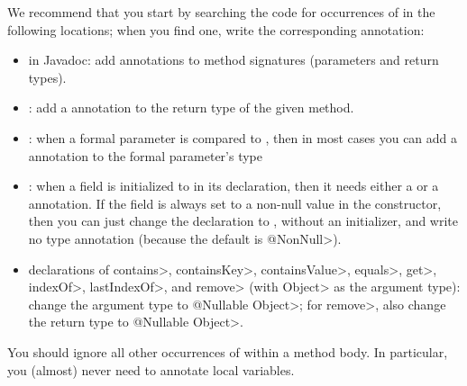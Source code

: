 We recommend that you start by searching the code for occurrences of
 in the following locations; when you find one, write the
corresponding annotation:

\begin{itemize}
\item
  in Javadoc:  add  annotations to method signatures (parameters and return types).
\item
  :  add a  annotation to the return type
  of the given method.
\item
  :  when a formal parameter is compared to
  , then in most cases you can add a  annotation
  to the formal parameter's type
\item
  :  when a field is initialized to
   in its declaration, then it needs either a
   or a
   annotation.  If the field
  is always set to a non-null value in the constructor, then you can just
  change the declaration to , without an
  initializer, and write no type annotation (because the default is
  \<@NonNull>).
\item
  declarations of \<contains>, \<containsKey>, \<containsValue>, \<equals>,
  \<get>, \<indexOf>, \<lastIndexOf>, and \<remove> (with \<Object> as the
  argument type):
  change the argument type to \<@Nullable Object>; for \<remove>, also change
  the return type to \<@Nullable Object>.

\end{itemize}

\noindent
You should ignore all other occurrences of  within a method
body.  In particular, you (almost) never need to annotate local variables.

